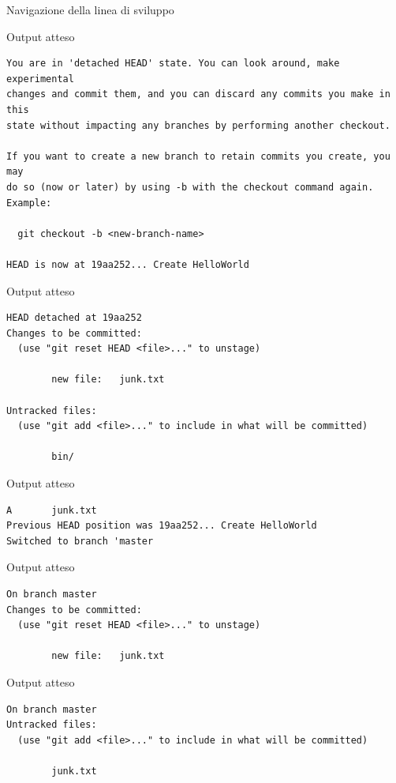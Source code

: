 \documentclass[xcolor=dvipsnames,presentation]{beamer}
\begin{document}
\begin{frame}{Navigazione della linea di sviluppo}
\begin{block}{Output atteso}
\begin{Verbatim}[fontsize=\scriptsize]
You are in 'detached HEAD' state. You can look around, make experimental
changes and commit them, and you can discard any commits you make in this
state without impacting any branches by performing another checkout.

If you want to create a new branch to retain commits you create, you may
do so (now or later) by using -b with the checkout command again. Example:

  git checkout -b <new-branch-name>

HEAD is now at 19aa252... Create HelloWorld
		\end{Verbatim}
	\end{block}
	\begin{block}{Output atteso}
		\begin{Verbatim}[fontsize=\scriptsize]
HEAD detached at 19aa252
Changes to be committed:
  (use "git reset HEAD <file>..." to unstage)

        new file:   junk.txt

Untracked files:
  (use "git add <file>..." to include in what will be committed)

        bin/

		\end{Verbatim}
	\end{block}
	\begin{block}{Output atteso}
		\begin{Verbatim}[fontsize=\scriptsize]
A       junk.txt
Previous HEAD position was 19aa252... Create HelloWorld
Switched to branch 'master
		\end{Verbatim}
	\end{block}
	\begin{block}{Output atteso}
		\begin{Verbatim}[fontsize=\scriptsize]
On branch master
Changes to be committed:
  (use "git reset HEAD <file>..." to unstage)

        new file:   junk.txt

		\end{Verbatim}
	\end{block}
	\begin{block}{Output atteso}
		\begin{Verbatim}[fontsize=\scriptsize]
On branch master
Untracked files:
  (use "git add <file>..." to include in what will be committed)

        junk.txt


\end{Verbatim}
\end{block}
\end{frame}
\end{document}

